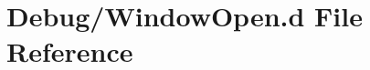 \hypertarget{_window_open_8d}{}\section{Debug/\+Window\+Open.d File Reference}
\label{_window_open_8d}
